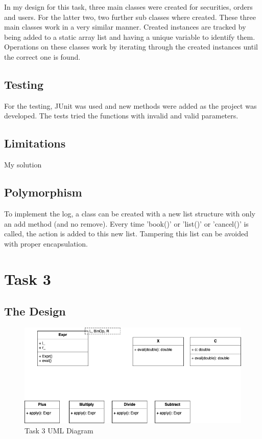 \documentclass[a4paper, 12pt]{report}
\begin{document}
In my design for this task, three main classes were created for securities, orders and users. For the latter two, two further sub classes where created. These three main classes work in a very similar manner. Created instances are tracked by being added to a static array list and having a unique variable to identify them. Operations on these classes work by iterating through the created instances until the correct one is found.


\subsection{Testing}
For the testing, JUnit was used and new methods were added as the project was developed. The tests tried the functions with invalid and valid parameters.

\subsection{Limitations}
My solution 

\subsection{Polymorphism}
To implement the log, a class can be created with a new list structure with only an add method (and no remove). Every time 'book()' or 'list()' or 'cancel()' is called, the action is added to this new list. Tampering this list can be avoided with proper encapsulation.

\section{Task 3}

\subsection{The Design}

\begin{figure}[H]
    \centering
    \includegraphics[width=1\textwidth]{"UML 3"}
    \caption{Task 3 UML Diagram}
\end{figure}
\end{document}
